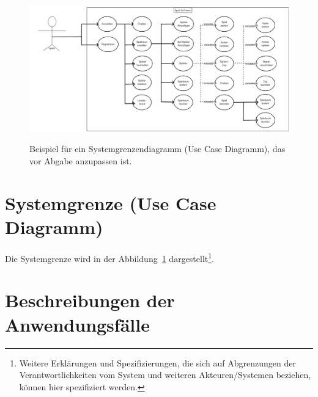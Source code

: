 \begin{figure}
\centering	
\includegraphics[width=1.1\textwidth]{img/ucd.png}
\label{fig:sys}
\caption{Beispiel für ein Systemgrenzendiagramm (Use Case Diagramm), das vor Abgabe anzupassen ist.}
\end{figure}

\section{Systemgrenze (Use Case Diagramm)}

Die Systemgrenze wird in der Abbildung~\ref{fig:sys} dargestellt\footnote{Weitere Erklärungen und Spezifizierungen, die sich auf Abgrenzungen der Verantwortlichkeiten vom System und weiteren Akteuren/Systemen beziehen, können hier spezifiziert werden.}. 


\section{Beschreibungen der Anwendungsfälle}


\setcounter{uc}{10}

